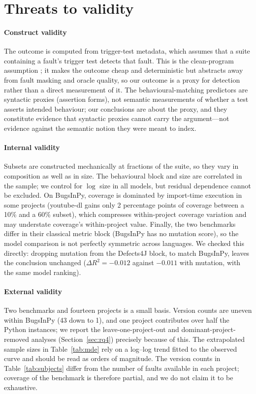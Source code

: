 \documentclass[preprint,12pt]{elsarticle}
\begin{document}
\section{Threats to validity}
\label{sec:threats}

\paragraph{Construct validity} The outcome is computed from trigger-test
metadata, which assumes that a suite containing a fault's trigger test
detects that fault. This is the clean-program assumption
\cite{chekam2017empirical}; it makes the outcome cheap and deterministic
but abstracts away from fault masking and oracle quality, so our outcome is
a proxy for detection rather than a direct measurement of it. The
behavioural-matching predictors are syntactic proxies (assertion forms),
not semantic measurements of whether a test asserts intended behaviour; our
conclusions are about the proxy, and they constitute evidence that
syntactic proxies cannot carry the argument---not evidence against the
semantic notion they were meant to index.

\paragraph{Internal validity} Subsets are constructed mechanically at
fractions of the suite, so they vary in composition as well as in size. The
behavioural block and size are correlated in the sample; we control for
$\log$ size in all models, but residual dependence cannot be excluded. On
BugsInPy, coverage is dominated by import-time execution in some projects
(youtube-dl gains only 2 percentage points of coverage between a 10\% and a
60\% subset), which compresses within-project coverage variation and may
understate coverage's within-project value. Finally, the two benchmarks
differ in their classical metric block (BugsInPy has no mutation score), so
the model comparison is not perfectly symmetric across languages. We checked
this directly: dropping mutation from the Defects4J block, to match BugsInPy,
leaves the conclusion unchanged ($\Delta R^2 = -0.012$ against $-0.011$ with
mutation, with the same model ranking).

\paragraph{External validity} Two benchmarks and fourteen projects is a
small basis. Version counts are uneven within BugsInPy (43 down to 1), and
one project contributes over half the Python instances; we report the
leave-one-project-out and dominant-project-removed analyses
(Section~\ref{sec:rq4}) precisely because of this. The extrapolated sample
sizes in Table~\ref{tab:mde} rely on a log--log trend fitted to the
observed curve and should be read as orders of magnitude. The version
counts in Table~\ref{tab:subjects} differ from the number of faults
available in each project; coverage of the benchmark is therefore partial,
and we do not claim it to be exhaustive.
\end{document}
